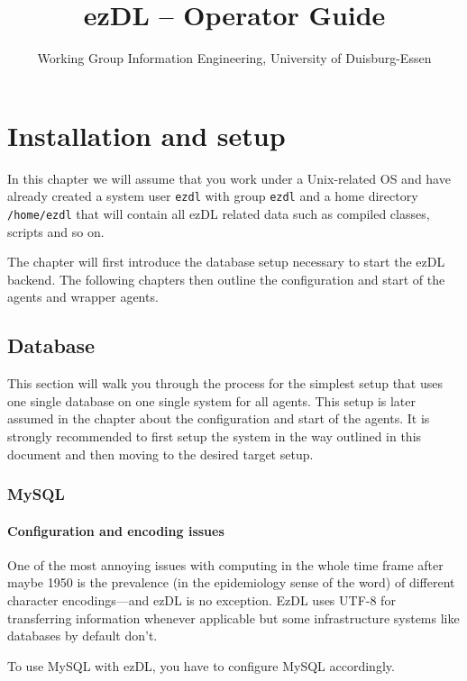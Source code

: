 \documentclass[12pt]{book}
\title{ezDL -- Operator Guide}
\author{Working Group Information Engineering, University of Duisburg-Essen}
\date{}
\begin{document}
  \maketitle 
  
\tableofcontents  
  
\chapter{Installation and setup}  

In this chapter we will assume that you work under a Unix-related OS and have already created a system user {\tt ezdl} with group {\tt ezdl} and a home directory {\tt /home/ezdl} that will contain all ezDL related data such as compiled classes, scripts and so on.

The chapter will first introduce the database setup necessary to start the ezDL backend. The following chapters then outline the configuration and start of the agents and wrapper agents.



\section{Database}

This section will walk you through the process for the simplest setup that uses one single database on one single system for all agents. This setup is later assumed in the chapter about the configuration and start of the agents. It is strongly recommended to first setup the system in the way outlined in this document and then moving to the desired target setup.


\subsection{MySQL}


\subsubsection{Configuration and encoding issues}

One of the most annoying issues with computing in the whole time frame after maybe 1950 is the prevalence (in the epidemiology sense of the word) of different character encodings---and ezDL is no exception. EzDL uses UTF-8 for transferring information whenever applicable but some infrastructure systems like databases by default don't. 

To use MySQL with ezDL, you have to configure MySQL accordingly.
\end{document}

